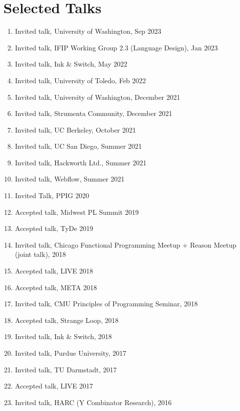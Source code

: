 \documentclass[10pt,letterpaper]{article}
\renewenvironment{itemize}{
  \begin{list}{}{
    \setlength{\leftmargin}{1.25em}
    \setlength{\itemsep}{0.25em}
    \setlength{\parskip}{0pt}
    \setlength{\parsep}{0.2em}
  }
}{
  \end{list}
}
\begin{document}
\section*{Selected Talks}
\begin{enumerate}
  \item Invited talk, University of Washington, Sep 2023
  \item Invited talk, IFIP Working Group 2.3 (Language Design), Jan 2023
  \item Invited talk, Ink \& Switch, May 2022
  \item Invited talk, University of Toledo, Feb 2022
  \item Invited talk, University of Washington, December 2021
  \item Invited talk, Strumenta Community, December 2021
  \item Invited talk, UC Berkeley, October 2021
  \item Invited talk, UC San Diego, Summer 2021
  \item Invited talk, Hackworth Ltd., Summer 2021
  \item Invited talk, Webflow, Summer 2021
  \item Invited Talk, PPIG 2020
  \item Accepted talk, Midwest PL Summit 2019
  \item Accepted talk, TyDe 2019
  \item Invited talk, Chicago Functional Programming Meetup + Reason Meetup (joint talk), 2018
  \item Accepted talk, LIVE 2018
  \item Accepted talk, META 2018
  \item Invited talk, CMU Principles of Programming Seminar, 2018
  \item Accepted talk, Strange Loop, 2018
  \item Invited talk, Ink \& Switch, 2018
  \item Invited talk, Purdue University, 2017
  \item Invited talk, TU Darmstadt, 2017
  \item Accepted talk, LIVE 2017
  \item Invited talk, HARC (Y Combinator Research), 2016

\end{enumerate}
\end{document}
